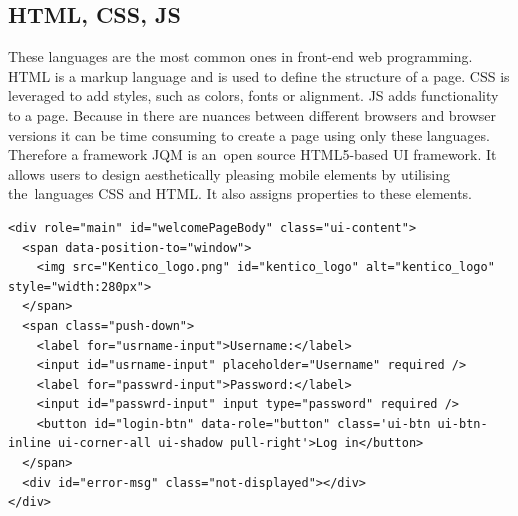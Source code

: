 \subsection{HTML, CSS, JS}
These languages are the most common ones in front-end web programming. HTML is a markup language and is used to define the structure of a page. CSS is leveraged to add styles, such as colors, fonts or alignment. JS adds functionality to a page. Because in there are nuances between different browsers and browser versions it can be time consuming to create a page using only these languages. Therefore a framework
JQM is an~open source HTML5-based UI framework. It allows users to design aesthetically pleasing mobile elements by utilising the~languages CSS and HTML. It also assigns properties to these elements. 
\lstset{style=sharpc, numbers=left}
\begin{lstlisting}
<div role="main" id="welcomePageBody" class="ui-content">
  <span data-position-to="window">
    <img src="Kentico_logo.png" id="kentico_logo" alt="kentico_logo" style="width:280px">
  </span>
  <span class="push-down">
    <label for="usrname-input">Username:</label>
    <input id="usrname-input" placeholder="Username" required />
    <label for="passwrd-input">Password:</label>
    <input id="passwrd-input" input type="password" required />
    <button id="login-btn" data-role="button" class='ui-btn ui-btn-inline ui-corner-all ui-shadow pull-right'>Log in</button>
  </span>
  <div id="error-msg" class="not-displayed"></div>
</div>
\end{lstlisting}
